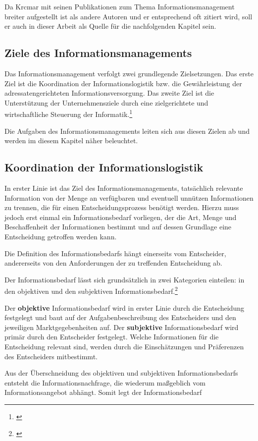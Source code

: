 Da Krcmar mit seinen Publikationen zum Thema Informationsmanagement breiter aufgestellt ist als andere Autoren und er entsprechend oft zitiert wird, soll er auch in dieser Arbeit als Quelle für die nachfolgenden Kapitel sein. 

\subsection{Ziele des Informationsmanagements}
Das Informationsmanagement verfolgt zwei grundlegende Zielsetzungen.
Das erste Ziel ist die Koordination der Informationslogistik bzw. die Gewährleistung der adressatengerichteten Informationsversorgung.
Das zweite Ziel ist die Unterstützung der Unternehmensziele durch eine zielgerichtete und wirtschaftliche Steuerung der Informatik.\footnote{\cite{zarnekow_intergriertes_2004}}

Die Aufgaben des Informationsmanagements leiten sich aus diesen Zielen ab und werden im diesem Kapitel näher beleuchtet.

\subsection{Koordination der Informationslogistik}
In erster Linie ist das Ziel des Informationsmanagements, tatsächlich relevante Information von der Menge an verfügbaren und eventuell unnützen Informationen zu trennen, die für einen Entscheidungsprozess benötigt werden. Hierzu muss jedoch erst einmal ein Informationsbedarf vorliegen, der die Art, Menge und Beschaffenheit der Informationen bestimmt und auf dessen Grundlage eine Entscheidung getroffen werden kann.

Die Definition des Informationsbedarfs hängt einerseits vom Entscheider, andererseits von den Anforderungen der zu treffenden Entscheidung ab.

Der Informationsbedarf lässt sich grundsätzlich in zwei Kategorien einteilen: in den objektiven und den subjektiven Informationsbedarf.\footnote{\cite{picot_grenzenlos_2003}}

Der \textbf{objektive} Informationsbedarf wird in erster Linie durch die Entscheidung festgelegt und baut auf der Aufgabenbeschreibung des Entscheiders und den jeweiligen Marktgegebenheiten auf.
Der \textbf{subjektive} Informationsbedarf wird primär durch den Entscheider festgelegt. Welche Informationen für die Entscheidung relevant sind, werden durch die Einschätzungen und Präferenzen des Entscheiders mitbestimmt.

Aus der Überschneidung des objektiven und subjektiven Informationsbedarfs entsteht die Informationsnachfrage, die wiederum maßgeblich vom Informationsangebot abhängt. Somit legt der Informationsbedarf

